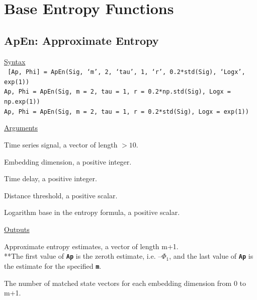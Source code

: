 \documentclass[12pt, a4paper, titlepage, openany]{book}
\begin{document}
\setlength{\parskip}{2em}

\newpage
\section{Base Entropy Functions}
\vspace{1cm}
\subsection{\normalsize ApEn: \hspace{15mm} Approximate Entropy} \label{ApEn}
\noindent\ul{Syntax} \vspace{6mm} \\ \noindent \texttt{\footnotesize
[Ap, Phi] = ApEn(Sig, ‘m’, 2, ‘tau’, 1, ‘r’, 0.2*std(Sig), ‘Logx’, exp(1))\\
 Ap, Phi  = ApEn(Sig, m = 2, tau = 1, r = 0.2*np.std(Sig), Logx = np.exp(1))\\
 Ap, Phi  = ApEn(Sig, m = 2, tau = 1, r = 0.2*std(Sig), Logx = exp(1))}

\noindent \ul{Arguments}
\begin{description}[labelsep=1cm, labelwidth=2cm, nosep,,style=multiline,leftmargin=3cm]\footnotesize
\item[\texttt{Sig}]		Time series signal, a vector of length $> 10$.
\item[\texttt{m}]		Embedding dimension, a positive integer.
\item[\texttt{tau}]		Time delay, a positive integer.
\item[\texttt{r}]		Distance threshold, a positive scalar.
\item[\texttt{Logx}]	Logarithm base in the entropy formula, a positive scalar.
\end{description}

\noindent \ul{Outputs}
\begin{description}[labelsep=1cm, labelwidth=2cm, nosep, style=multiline,leftmargin=3cm]\footnotesize
\item[\texttt{Ap}]		Approximate entropy estimates, a vector of length m+1.\\
			**The first value of \texttt{\textbf{Ap}} is the zeroth estimate, i.e. $– \Phi_1$,
				and the last value of \texttt{\textbf{Ap}} is the estimate for the specified \texttt{\textbf{m}}.
\item[\texttt{Phi}]		The number of matched state vectors for each embedding dimension from 0 to m+1.
\end{description}
\end{document}
